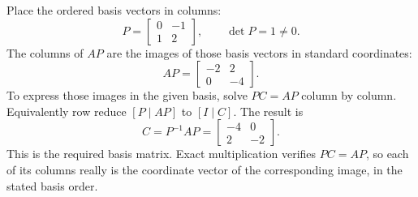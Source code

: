 Place the ordered basis vectors in columns:
\[P=\begin{bmatrix}0&-1\\1&2\end{bmatrix},\qquad\det P=1\ne0.\]
The columns of $AP$ are the images of those basis vectors in standard coordinates:
\[AP=\begin{bmatrix}-2&2\\0&-4\end{bmatrix}.\]
To express those images in the given basis, solve $PC=AP$ column by column. Equivalently row reduce $[P\mid AP]$ to $[I\mid C]$. The result is
\[C=P^{-1}AP=\begin{bmatrix}-4&0\\2&-2\end{bmatrix}.\]
This is the required basis matrix. Exact multiplication verifies $PC=AP$, so each of its columns really is the coordinate vector of the corresponding image, in the stated basis order.


